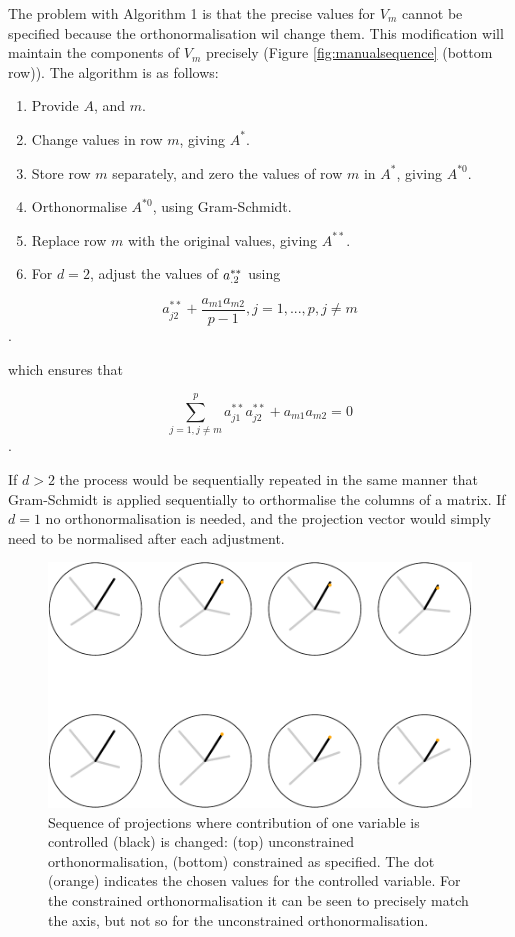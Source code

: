\documentclass[]{interact}
\theoremstyle{plain}%
\theoremstyle{definition}
\theoremstyle{remark}
\def\tightlist{}
\begin{document}
The problem with Algorithm 1 is that the precise values for \(V_m\)
cannot be specified because the orthonormalisation wil change them. This
modification will maintain the components of \(V_m\) precisely (Figure
\ref{fig:manualsequence} (bottom row)). The algorithm is as follows:

\begin{enumerate}
\def\labelenumi{\arabic{enumi}.}
\tightlist
\item
  Provide \(A\), and \(m\).
\item
  Change values in row \(m\), giving \(A^*\).
\item
  Store row \(m\) separately, and zero the values of row \(m\) in
  \(A^*\), giving \(A^{*0}\).
\item
  Orthonormalise \(A^{*0}\), using Gram-Schmidt.
\item
  Replace row \(m\) with the original values, giving \(A^{**}\).
\item
  For \(d=2\), adjust the values of \({\boldmath a}^{**}_{.2}\) using
\end{enumerate}

\[a^{**}_{j2}+\frac{a_{m1}a_{m2}}{p-1}, j=1, ..., p, j\neq m\].

which ensures that

\[\sum_{j=1, j\neq m}^p a^{**}_{j1}a^{**}_{j2} + a_{m1}a_{m2} = 0\].

If \(d>2\) the process would be sequentially repeated in the same manner
that Gram-Schmidt is applied sequentially to orthormalise the columns of
a matrix. If \(d=1\) no orthonormalisation is needed, and the projection
vector would simply need to be normalised after each adjustment.

\begin{figure}
\centering
\includegraphics{paper_files/figure-latex/manualsequence-1.pdf}
\caption{Sequence of projections where contribution of one variable is
controlled (black) is changed: (top) unconstrained orthonormalisation,
(bottom) constrained as specified. The dot (orange) indicates the chosen
values for the controlled variable. For the constrained
orthonormalisation it can be seen to precisely match the axis, but not
so for the unconstrained orthonormalisation.}
\end{figure}
\end{document}
